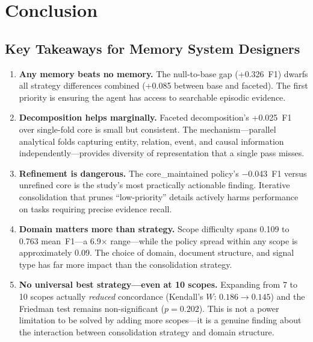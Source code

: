 \documentclass[11pt,a4paper]{article}
\begin{document}
\section{Conclusion}

\subsection{Key Takeaways for Memory System Designers}

\begin{enumerate}
    \item \textbf{Any memory beats no memory.} The null-to-base gap (+0.326~F1) dwarfs all strategy differences combined (+0.085 between base and faceted). The first priority is ensuring the agent has access to searchable episodic evidence.

    \item \textbf{Decomposition helps marginally.} Faceted decomposition's +0.025~F1 over single-fold core is small but consistent. The mechanism---parallel analytical folds capturing entity, relation, event, and causal information independently---provides diversity of representation that a single pass misses.

    \item \textbf{Refinement is dangerous.} The core\_maintained policy's $-$0.043~F1 versus unrefined core is the study's most practically actionable finding. Iterative consolidation that prunes ``low-priority'' details actively harms performance on tasks requiring precise evidence recall.

    \item \textbf{Domain matters more than strategy.} Scope difficulty spans 0.109 to 0.763 mean~F1---a 6.9$\times$ range---while the policy spread within any scope is approximately 0.09. The choice of domain, document structure, and signal type has far more impact than the consolidation strategy.

    \item \textbf{No universal best strategy---even at 10 scopes.} Expanding from 7 to 10 scopes actually \emph{reduced} concordance (Kendall's $W$: $0.186 \to 0.145$) and the Friedman test remains non-significant ($p = 0.202$). This is not a power limitation to be solved by adding more scopes---it is a genuine finding about the interaction between consolidation strategy and domain structure.
\end{enumerate}
\end{document}
